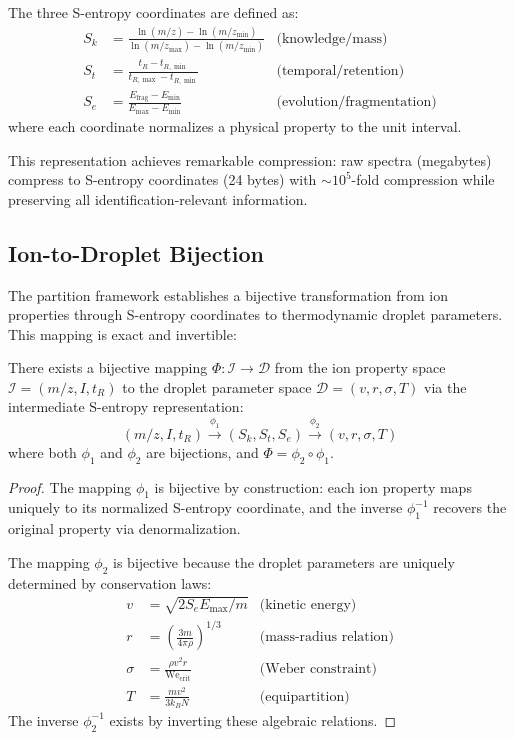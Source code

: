 \begin{definition}
The three S-entropy coordinates are defined as:
\begin{align}
S_k &= \frac{\ln(m/z) - \ln(m/z_{\min})}{\ln(m/z_{\max}) - \ln(m/z_{\min})} & \text{(knowledge/mass)} \\
S_t &= \frac{t_R - t_{R,\min}}{t_{R,\max} - t_{R,\min}} & \text{(temporal/retention)} \\
S_e &= \frac{E_{\text{frag}} - E_{\min}}{E_{\max} - E_{\min}} & \text{(evolution/fragmentation)}
\end{align}
where each coordinate normalizes a physical property to the unit interval.
\end{definition}

This representation achieves remarkable compression: raw spectra (megabytes) compress to S-entropy coordinates (24 bytes) with $\sim 10^5$-fold compression while preserving all identification-relevant information.

\subsection{Ion-to-Droplet Bijection}

The partition framework establishes a bijective transformation from ion properties through S-entropy coordinates to thermodynamic droplet parameters. This mapping is exact and invertible:

\begin{theorem}
There exists a bijective mapping $\Phi: \mathcal{I} \to \mathcal{D}$ from the ion property space $\mathcal{I} = (m/z, I, t_R)$ to the droplet parameter space $\mathcal{D} = (v, r, \sigma, T)$ via the intermediate S-entropy representation:
\begin{equation}
(m/z, I, t_R) \xrightarrow{\phi_1} (S_k, S_t, S_e) \xrightarrow{\phi_2} (v, r, \sigma, T)
\end{equation}
where both $\phi_1$ and $\phi_2$ are bijections, and $\Phi = \phi_2 \circ \phi_1$.
\end{theorem}

\begin{proof}
The mapping $\phi_1$ is bijective by construction: each ion property maps uniquely to its normalized S-entropy coordinate, and the inverse $\phi_1^{-1}$ recovers the original property via denormalization.

The mapping $\phi_2$ is bijective because the droplet parameters are uniquely determined by conservation laws:
\begin{align}
v &= \sqrt{2 S_e E_{\max} / m} & \text{(kinetic energy)} \\
r &= \left(\frac{3m}{4\pi\rho}\right)^{1/3} & \text{(mass-radius relation)} \\
\sigma &= \frac{\rho v^2 r}{\text{We}_{\text{crit}}} & \text{(Weber constraint)} \\
T &= \frac{m v^2}{3 k_B N} & \text{(equipartition)}
\end{align}
The inverse $\phi_2^{-1}$ exists by inverting these algebraic relations.
\end{proof}

